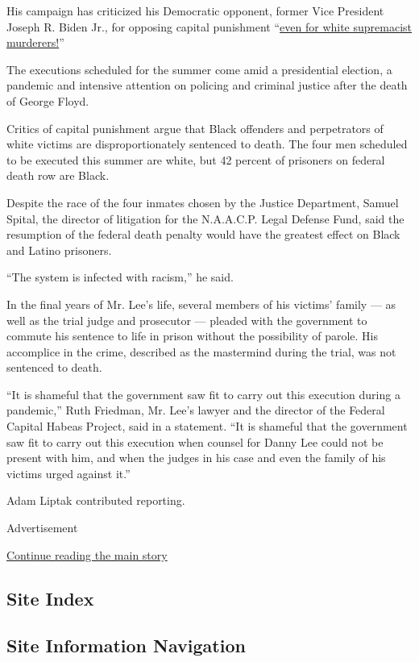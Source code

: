 His campaign has criticized his Democratic opponent, former Vice
President Joseph R. Biden Jr., for opposing capital punishment
``\href{https://twitter.com/TrumpWarRoom/status/1274050283098734593}{even
for white supremacist murderers!}''

The executions scheduled for the summer come amid a presidential
election, a pandemic and intensive attention on policing and criminal
justice after the death of George Floyd.

Critics of capital punishment argue that Black offenders and
perpetrators of white victims are disproportionately sentenced to death.
The four men scheduled to be executed this summer are white, but 42
percent of prisoners on federal death row are Black.

Despite the race of the four inmates chosen by the Justice Department,
Samuel Spital, the director of litigation for the N.A.A.C.P. Legal
Defense Fund, said the resumption of the federal death penalty would
have the greatest effect on Black and Latino prisoners.

``The system is infected with racism,'' he said.

In the final years of Mr. Lee's life, several members of his victims'
family --- as well as the trial judge and prosecutor --- pleaded with
the government to commute his sentence to life in prison without the
possibility of parole. His accomplice in the crime, described as the
mastermind during the trial, was not sentenced to death.

``It is shameful that the government saw fit to carry out this execution
during a pandemic,'' Ruth Friedman, Mr. Lee's lawyer and the director of
the Federal Capital Habeas Project, said in a statement. ``It is
shameful that the government saw fit to carry out this execution when
counsel for Danny Lee could not be present with him, and when the judges
in his case and even the family of his victims urged against it.''

Adam Liptak contributed reporting.

Advertisement

\protect\hyperlink{after-bottom}{Continue reading the main story}

\hypertarget{site-index}{%
\subsection{Site Index}\label{site-index}}

\hypertarget{site-information-navigation}{%
\subsection{Site Information
Navigation}\label{site-information-navigation}}

